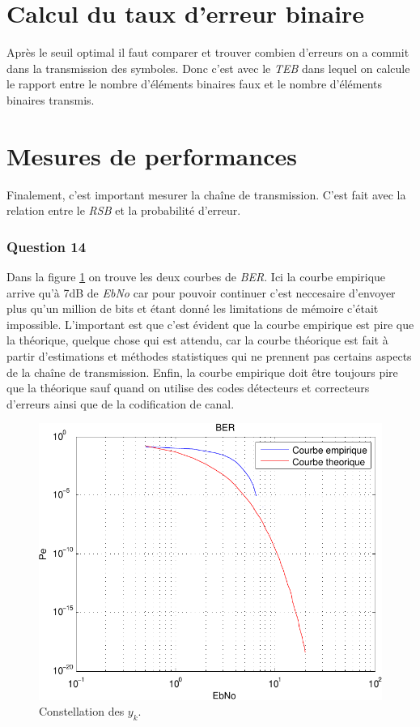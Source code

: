 \documentclass[a4paper,11pt]{article}
\begin{document}
\section{Calcul du taux d'erreur binaire}
Après le seuil optimal il faut comparer et trouver combien d'erreurs on a commit dans la transmission des symboles. Donc c'est avec le \emph{TEB} dans lequel on calcule le rapport entre le nombre d'éléments binaires faux et le nombre d'éléments binaires transmis.
\section{Mesures de performances}
Finalement, c'est important mesurer la chaîne de transmission. C'est fait avec la relation entre le \emph{RSB} et la probabilité d'erreur.
\subsubsection*{Question 14}
Dans la figure \ref{fig:q14} on trouve les deux courbes de \emph{BER}. Ici la courbe empirique arrive qu'à 7dB de \emph{EbNo} car pour pouvoir continuer c'est neccesaire d'envoyer plus qu'un million de bits et étant donné les limitations de mémoire c'était impossible. L'important est que c'est évident que la courbe empirique est pire que la théorique, quelque chose qui est attendu, car la courbe théorique est fait à partir d'estimations et méthodes statistiques qui ne prennent pas certains aspects de la chaîne de transmission. Enfin, la courbe empirique doit être toujours pire que la théorique sauf quand on utilise des codes détecteurs et correcteurs d'erreurs ainsi que de la codification de canal.

\begin{figure}
	\begin{center}
	\includegraphics[scale=1]{Q14-BER-crop.pdf}
	\caption{Constellation des $y_k$.}
	\label{fig:q14}
	\end{center}
\end{figure}  
\end{document}
